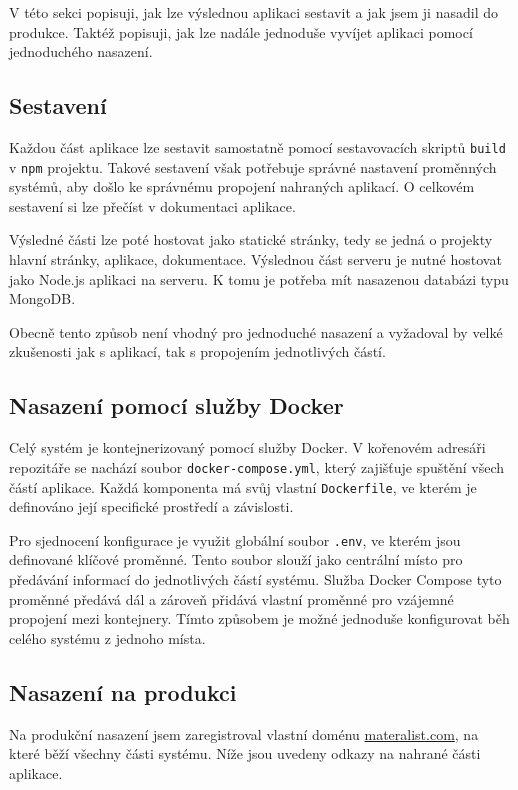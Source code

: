 V této sekci popisuji, jak lze výslednou aplikaci sestavit a jak jsem ji nasadil do produkce.
Taktéž popisuji, jak lze nadále jednoduše vyvíjet aplikaci pomocí jednoduchého nasazení. 

\subsection{Sestavení}

Každou část aplikace lze sestavit samostatně pomocí sestavovacích skriptů \verb|build| v \verb|npm| projektu.
Takové sestavení však potřebuje správné nastavení proměnných systémů, aby došlo ke správnému propojení nahraných aplikací.
O celkovém sestavení si lze přečíst v dokumentaci aplikace.

Výsledné části lze poté hostovat jako statické stránky, tedy se jedná o projekty hlavní stránky, aplikace, dokumentace.
Výslednou část serveru je nutné hostovat jako Node.js aplikaci na serveru.
K tomu je potřeba mít nasazenou databázi typu MongoDB.

Obecně tento způsob není vhodný pro jednoduché nasazení a vyžadoval by velké zkušenosti jak s aplikací, tak s propojením jednotlivých částí. 

\subsection{Nasazení pomocí služby Docker}

Celý systém je kontejnerizovaný pomocí služby Docker.
V kořenovém adresáři repozitáře se nachází soubor \texttt{docker-compose.yml}, který zajišťuje spuštění všech částí aplikace. 
Každá komponenta má svůj vlastní \texttt{Dockerfile}, ve kterém je definováno její specifické prostředí a závislosti.

Pro sjednocení konfigurace je využit globální soubor \texttt{.env}, ve kterém jsou definované klíčové proměnné. 
Tento soubor slouží jako centrální místo pro předávání informací do jednotlivých částí systému. 
Služba Docker Compose tyto proměnné předává dál a zároveň přidává vlastní proměnné pro vzájemné propojení mezi kontejnery. 
Tímto způsobem je možné jednoduše konfigurovat běh celého systému z jednoho místa.

\subsection{Nasazení na produkci}

Na produkční nasazení jsem zaregistroval vlastní doménu \href{https://materalist.com}{materalist.com}, na které běží všechny části systému.  
Níže jsou uvedeny odkazy na nahrané části aplikace.

